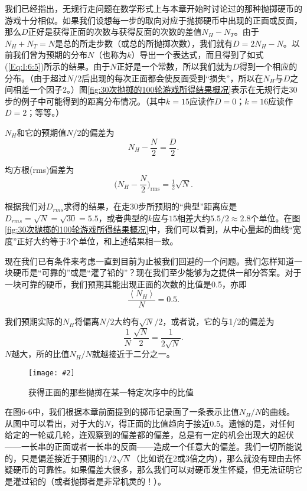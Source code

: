 \documentclass[12pt,oneside]{book}
\newenvironment{fig}[2][1]
{\begin{figure}[H]
\centering
\texttt{[image: \#2]}}
{\end{figure}}
\begin{document}
我们已经指出，无规行走问题在数学形式上与本章开始时讨论过的那种抛掷硬币的游戏十分相似。如果我们设想每一步的取向对应于抛掷硬币中出现的正面或反面，那么$D$正好是获得正面的次数与获得反面的次数的差值$N_H-N_T$。由于$N_H+N_T=N$是总的所走步数（或总的所抛掷次数），我们就有$D=2N_H-N$。以前我们曾为预期的分布$N$（也称为$k$）导出一个表达式，而且得到了如式(\ref{Eq:I:6:5})所示的结果。由于$N$正好是一个常数，所以我们就为$D$得到一个相应的分布。（由于超过$N/2$后出现的每次正面都会使反面受到“损失”，所以在$N_H$与$D$之间相差一个因子$2$。）图\ref{fig:30次抛掷的100轮游戏所得结果概况}表示在无规行走30步的例子中可能得到的距离分布情况。（其中$k=15$应读作$D=0$；$k=16$应读作$D=2$；等等。）

$N_H$和它的预期值$N/2$的偏差为
\begin{equation}
\label{Eq:I:6:11}
N_H-\frac{N}{2}=\frac{D}{2}.
\end{equation}

均方根(rms)偏差为
\begin{equation}
\label{Eq:I:6:12}
\biggl(N_H-\frac{N}{2}\biggr)_{\text{rms}}=\tfrac{1}{2}\sqrt{N}.
\end{equation}

根据我们对$D_{rms}$求得的结果，在走30步所预期的“典型”距离应是$D_{rms}=\sqrt{N}=\sqrt{30}=5.5$，或者典型的$k$应与$15$相差大约$5.5/2 \approx 2.8$个单位。在图\ref{fig:30次抛掷的100轮游戏所得结果概况}中，我们可以看到，从中心量起的曲线“宽度”正好大约等于3个单位，和上述结果相一致。

现在我们已有条件来考虑一直到目前为止被我们回避的一个问题。我们怎样知道一块硬币是“可靠的”或是“灌了铅的”？现在我们至少能够为之提供一部分答案。对于一块可靠的硬币，我们预期其能出现正面的次数的比值是0.5，亦即
\begin{equation}
\label{Eq:I:6:13}
\frac{\left < N_H \right > }{N}=0.5.
\end{equation}

我们预期实际的$N_H$将偏离$N/2$大约有$\sqrt{N}/2$，或者说，它的与1/2的偏差为
\begin{equation*}
\frac{1}{N}\,\frac{\sqrt{N}}{2}=\frac{1}{2\sqrt{N}}.
\end{equation*}
$N$越大，所的比值$N_H/N$就越接近于二分之一。

\begin{fig}{获得正面的那些抛掷在某一特定次序中的比值}
\caption{获得正面的那些抛掷在某一特定次序中的比值}
\label{fig:获得正面的那些抛掷在某一特定次序中的比值}
\end{fig}
在图6-6中，我们根据本章前面提到的掷币记录画了一条表示比值$N_H/N$的曲线。从图中可以看出，对于大的$N$，得正面的比值趋向于接近0.5。遗憾的是，对任何给定的一轮或几轮，连观察到的偏差都的偏差，总是有一定的机会出现大的起伏——一长串的正面或者一长串的反面——造成一个任意大的偏差。我们一切所能说的，只是偏差接近于预期的$1/2\sqrt{N}$（比如说在2或3倍之内），那么就没有理由去怀疑硬币的可靠性。如果偏差大很多，那么我们可以对硬币发生怀疑，但无法证明它是灌过铅的（或者抛掷者是非常机灵的！）。
\end{document}
